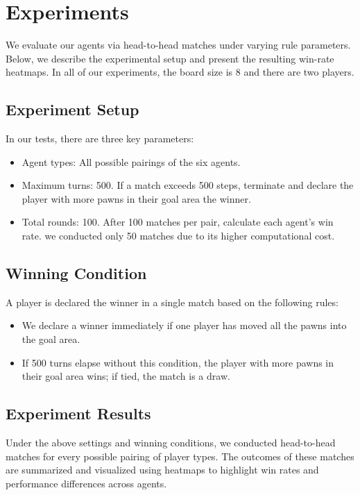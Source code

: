 \section{Experiments}
We evaluate our agents via head-to-head matches under varying rule parameters. Below, we describe the experimental setup and present the resulting win-rate heatmaps. In all of our experiments, the board size is 8 and there are two players. 

\subsection{Experiment Setup}
In our tests, there are three key parameters:
\begin{itemize}
  \item Agent types: All possible pairings of the six agents.
  \item Maximum turns: 500.  
    If a match exceeds 500 steps, terminate and declare the player with more pawns in their goal area the winner.
  \item Total rounds: 100.  
    After 100 matches per pair, calculate each agent's win rate. we conducted only 50 matches due to its higher computational cost.
\end{itemize}

\subsection{Winning Condition}
A player is declared the winner in a single match based on the following rules:
\begin{itemize}
  \item We declare a winner immediately if one player has moved all the pawns into the goal area.  
  \item If 500 turns elapse without this condition, the player with more pawns in their goal area wins; if tied, the match is a draw.
\end{itemize}

\subsection{Experiment Results}
Under the above settings and winning conditions, we conducted head-to-head matches for every possible pairing of player types. The outcomes of these matches are summarized and visualized using heatmaps to highlight win rates and performance differences across agents.

